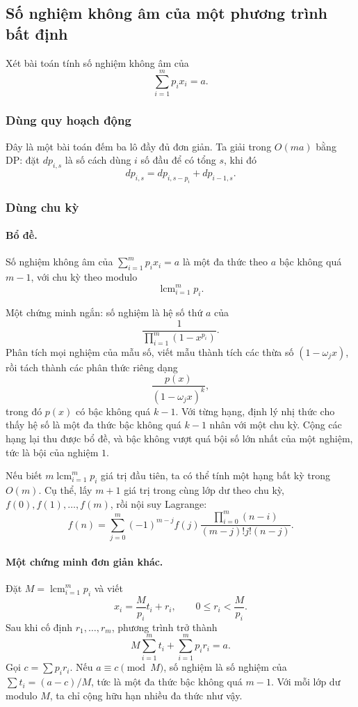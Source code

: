 \documentclass[11pt]{article}
\begin{document}
\subsection{Số nghiệm không âm của một phương trình bất định}

Xét bài toán tính số nghiệm không âm của
\[
  \sum_{i=1}^{m}p_i x_i=a.
\]

\subsubsection{Dùng quy hoạch động}

Đây là một bài toán đếm ba lô đầy đủ đơn giản. Ta giải trong \(O(ma)\) bằng DP:
đặt \(dp_{i,s}\) là số cách dùng \(i\) số đầu để có tổng \(s\), khi đó
\[
  dp_{i,s}=dp_{i,s-p_i}+dp_{i-1,s}.
\]

\subsubsection{Dùng chu kỳ}

\paragraph{Bổ đề.}
Số nghiệm không âm của \(\sum_{i=1}^{m}p_i x_i=a\) là một đa thức theo \(a\)
bậc không quá \(m-1\), với chu kỳ theo modulo
\[
  \operatorname{lcm}_{i=1}^{m}p_i.
\]

Một chứng minh ngắn: số nghiệm là hệ số thứ \(a\) của
\[
  \frac{1}{\prod_{i=1}^{m}(1-x^{p_i})}.
\]
Phân tích mọi nghiệm của mẫu số, viết mẫu thành tích các thừa số
\((1-\omega_jx)\), rồi tách thành các phân thức riêng dạng
\[
  \frac{p(x)}{(1-\omega_jx)^k},
\]
trong đó \(p(x)\) có bậc không quá \(k-1\). Với từng hạng, định lý nhị thức cho
thấy hệ số là một đa thức bậc không quá \(k-1\) nhân với một chu kỳ. Cộng các
hạng lại thu được bổ đề, và bậc không vượt quá bội số lớn nhất của một nghiệm,
tức là bội của nghiệm \(1\).

Nếu biết \(m\operatorname{lcm}_{i=1}^{m}p_i\) giá trị đầu tiên, ta có thể tính
một hạng bất kỳ trong \(O(m)\). Cụ thể, lấy \(m+1\) giá trị trong cùng lớp dư
theo chu kỳ, \(f(0),f(1),\ldots,f(m)\), rồi nội suy Lagrange:
\[
  f(n)=\sum_{j=0}^{m}(-1)^{m-j}f(j)
  \frac{\prod_{i=0}^{m}(n-i)}{(m-j)!j!(n-j)}.
\]

\paragraph{Một chứng minh đơn giản khác.}
Đặt \(M=\operatorname{lcm}_{i=1}^{m}p_i\) và viết
\[
  x_i=\frac{M}{p_i}t_i+r_i,\qquad 0\le r_i<\frac{M}{p_i}.
\]
Sau khi cố định \(r_1,\ldots,r_m\), phương trình trở thành
\[
  M\sum_{i=1}^{m}t_i+\sum_{i=1}^{m}p_i r_i=a.
\]
Gọi \(c=\sum p_ir_i\). Nếu \(a\equiv c\pmod M\), số nghiệm là số nghiệm của
\(\sum t_i=(a-c)/M\), tức là một đa thức bậc không quá \(m-1\). Với mỗi lớp dư
modulo \(M\), ta chỉ cộng hữu hạn nhiều đa thức như vậy.
\end{document}
